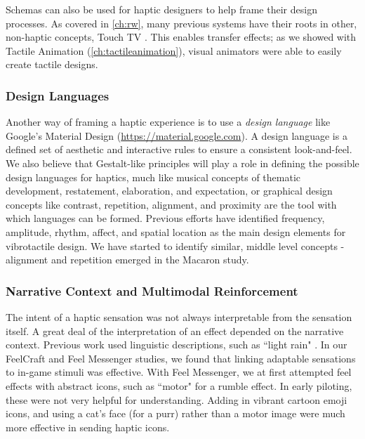 Schemas can also be used for haptic designers to help frame their design processes.
As covered in \autoref{ch:rw}, many previous systems have their roots in other, non-haptic concepts, \eg Touch TV \cite{}.
This enables transfer effects; as we showed with Tactile Animation (\autoref{ch:tactileanimation}), visual animators were able to easily create tactile designs.

\subsubsection{Design Languages}
Another way of framing a haptic experience is to use a \emph{design language} like Google's Material Design (\url{https://material.google.com}).
A design language is a defined set of aesthetic and interactive rules to ensure a consistent look-and-feel.
We also believe that Gestalt-like principles will play a role in defining the possible design languages for haptics,
much like musical concepts of thematic development, restatement, elaboration, and expectation, or graphical design concepts like contrast, repetition, alignment, and proximity are the tool with which languages can be formed.
Previous efforts have identified frequency, amplitude, rhythm, affect, and spatial location as the main design elements for vibrotactile design.
We have started to identify similar, middle level concepts - alignment and repetition emerged in the Macaron study.


\subsubsection{Narrative Context and Multimodal Reinforcement}
The intent of a haptic sensation was not always interpretable from the sensation itself.
A great deal of the interpretation of an effect depended on the narrative context.
Previous work used linguistic descriptions, such as ``light rain" \cite{Israr2014}.
In our FeelCraft and Feel Messenger studies, we found that linking adaptable sensations to in-game stimuli was effective.
With Feel Messenger, we at first attempted feel effects with abstract icons, such as ``motor" for a rumble effect. 
In early piloting, these were not very helpful for understanding.
Adding in vibrant cartoon emoji icons, and using  a cat's face (for a purr) rather than a motor image were much more effective in sending haptic icons.

